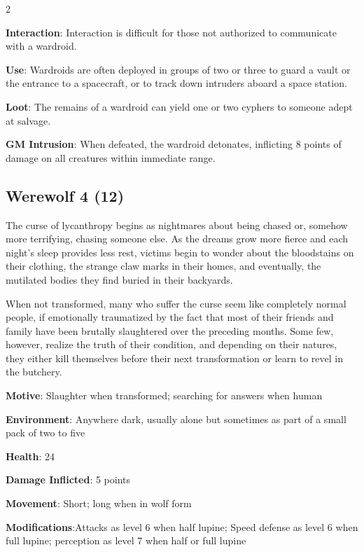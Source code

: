 \begin{multicols}{2} 

\textbf{Interaction}: Interaction is difficult for those not authorized to communicate with a wardroid.

\textbf{Use}: Wardroids are often deployed in groups of two or three to guard a vault or the entrance to a spacecraft, or to track down intruders aboard a space station.

\textbf{Loot}: The remains of a wardroid can yield one or two cyphers to someone adept at salvage.

\textbf{GM Intrusion}: When defeated, the wardroid detonates, inflicting 8 points of damage on all creatures within immediate range.

\subsection{Werewolf	4 (12)}

The curse of lycanthropy begins as nightmares about being chased or, somehow more terrifying, chasing someone else. As the dreams grow more fierce and each night’s sleep provides less rest, victims begin to wonder about the bloodstains on their clothing, the strange claw marks in their homes, and eventually, the mutilated bodies they find buried in their backyards.

When not transformed, many who suffer the curse seem like completely normal people, if emotionally traumatized by the fact that most of their friends and family have been brutally slaughtered over the preceding months. Some few, however, realize the truth of their condition, and depending on their natures, they either kill themselves before their next transformation or learn to revel in the butchery.

\textbf{Motive}: Slaughter when transformed; searching for answers when human

\textbf{Environment}: Anywhere dark, usually alone but sometimes as part of a small pack of two to five 

\textbf{Health}: 24

\textbf{Damage Inflicted}: 5 points

\textbf{Movement}: Short; long when in wolf form

\textbf{Modifications}:Attacks as level 6 when half lupine; Speed defense as level 6 when full lupine; perception as level 7 when half or full lupine


\end{multicols}

